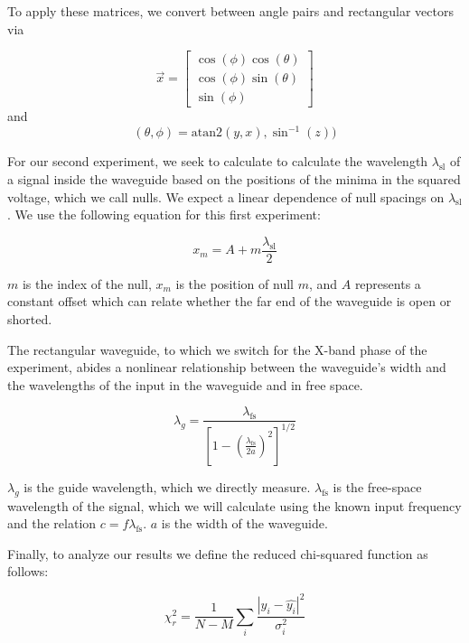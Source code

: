 \documentclass[12pt]{article}
\begin{document}
To apply these matrices, we convert between angle pairs and rectangular vectors via

\begin{equation}
\vec{x} = 
\begin{bmatrix}
\cos(\phi) \cos(\theta) \\
\cos(\phi) \sin(\theta) \\
\sin(\phi)
\end{bmatrix}
\end{equation}
and
\begin{equation}
(\theta, \phi) = \text{atan2}(y, x), \sin^{-1}(z))
\end{equation}

For our second experiment, we seek to calculate to calculate the wavelength $\lambda_\text{sl}$ of a signal inside the waveguide based on the positions of the minima in the squared voltage, which we call nulls. We expect a linear dependence of null spacings on $\lambda_\text{sl}$. We use the following equation for this first experiment:

\begin{equation}
x_m = A + m \frac{\lambda_\text{sl}}{2}
\end{equation}

$m$ is the index of the null, $x_m$ is the position of null $m$, and $A$ represents a constant offset which can relate whether the far end of the waveguide is open or shorted.

The rectangular waveguide, to which we switch for the X-band phase of the experiment, abides a nonlinear relationship between the waveguide's width and the wavelengths of the input in the waveguide and in free space.

\begin{equation} \label{eq:xband}
\lambda_g = \frac{\lambda_\text{fs}}{[1 - (\frac{\lambda_\text{fs}}{2a})^2]^{1/2}}
\end{equation}

$\lambda_g$ is the guide wavelength, which we directly measure. $\lambda_\text{fs}$ is the free-space wavelength of the signal, which we will calculate using the known input frequency and the relation $c = f \lambda_\text{fs}$. $a$ is the width of the waveguide.

Finally, to analyze our results we define the reduced chi-squared function as follows:

\begin{equation}
\chi_r^2 = \frac{1}{N - M} \sum_i \frac{|y_i - \hat{y_i}|^2}{\sigma_i^2}
\end{equation}
\end{document}
